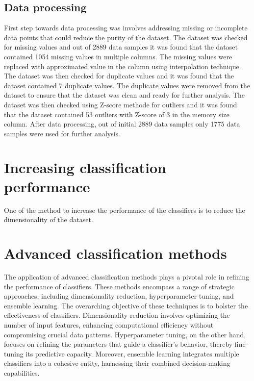 \documentclass[conference,onecolumn]{IEEEtran}
\begin{document}

\subsection{Data processing}
    First step towards data processing was involves addressing missing or incomplete data points that could reduce the purity of the dataset. The dataset was checked for missing values and out of 2889 data samples it was found that the dataset contained 1054 missing values in multiple columns. The missing values were replaced with approximated value in the column using interpolation technique. The dataset was then checked for duplicate values and it was found that the dataset contained 7 duplicate values. The duplicate values were removed from the dataset to ensure that the dataset was clean and ready for further analysis. The dataset was then checked using Z-score methode for outliers and it was found that the dataset contained 53 outliers with Z-score of 3 in the memory size column.
    After data processing, out of initial 2889 data samples only 1775 data samples were used for further analysis.



\section{Increasing classification performance}
    One of the method to increase the performance of the classifiers is to reduce the dimensionality of the dataset.

\section{Advanced classification methods}
    The application of advanced classification methods plays a pivotal role in refining the performance of classifiers. These methods encompass a range of strategic approaches, including dimensionality reduction, hyperparameter tuning, and ensemble learning. The overarching objective of these techniques is to bolster the effectiveness of classifiers. Dimensionality reduction involves optimizing the number of input features, enhancing computational efficiency without compromising crucial data patterns. Hyperparameter tuning, on the other hand, focuses on refining the parameters that guide a classifier's behavior, thereby fine-tuning its predictive capacity. Moreover, ensemble learning integrates multiple classifiers into a cohesive entity, harnessing their combined decision-making capabilities.
\end{document}
